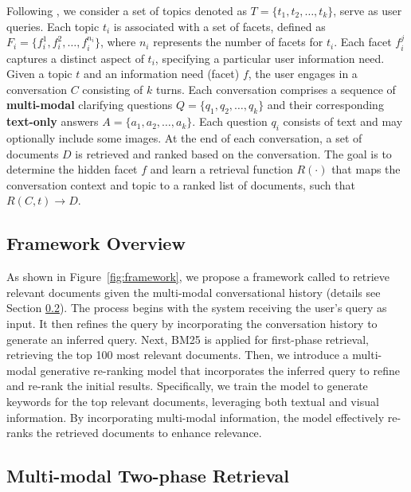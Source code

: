 \documentclass[11pt]{article}
\begin{document}
Following \cite{yuan2024askingmultimodalclarifyingquestions}, we consider a set of topics denoted as \( T = \{t_1, t_2, \dots, t_k\} \), serve as user queries. Each topic \( t_i \) is associated with a set of facets, defined as \( F_i = \{ f_i^1, f_i^2, \dots, f_i^{n_i} \} \), where \( n_i \) represents the number of facets for \( t_i \). Each facet \( f_i^j \) captures a distinct aspect of \( t_i \), specifying a particular user information need.  
Given a topic \( t \) and an information need (facet) \( f \), the user engages in a conversation \( C \) consisting of \( k \) turns. Each conversation comprises a sequence of \textbf{multi-modal} clarifying questions \( Q = \{q_1, q_2, \dots, q_k\} \) and their corresponding \textbf{text-only} answers \( A = \{a_1, a_2, \dots, a_k\} \). Each question \( q_i \) consists of text and may optionally include some images. At the end of each conversation, a set of documents $D$ is retrieved and ranked based on the conversation. The goal is to determine the hidden facet $f$ and learn a retrieval function $R(\cdot)$ that maps the conversation context and topic to a ranked list of documents, such that \( R(C,t) \to D \).




\subsection{Framework Overview}
As shown in Figure~\ref{fig:framework}, we propose a framework called \OurModel{} to retrieve relevant documents given the multi-modal conversational history (details see Section \ref{sec:gen_retrieval}). The process begins with the system receiving the user's query as input. It then refines the query by incorporating the conversation history to generate an inferred query. Next, BM25 is applied for first-phase retrieval, retrieving the top 100 most relevant documents. Then, we introduce a multi-modal generative re-ranking model that incorporates the inferred query to refine and re-rank the initial results. Specifically, we train the model to generate keywords for the top relevant documents, leveraging both textual and visual information. By incorporating multi-modal information, the model effectively re-ranks the retrieved documents to enhance relevance.












\subsection{Multi-modal Two-phase Retrieval}
\label{sec:gen_retrieval}
\end{document}
